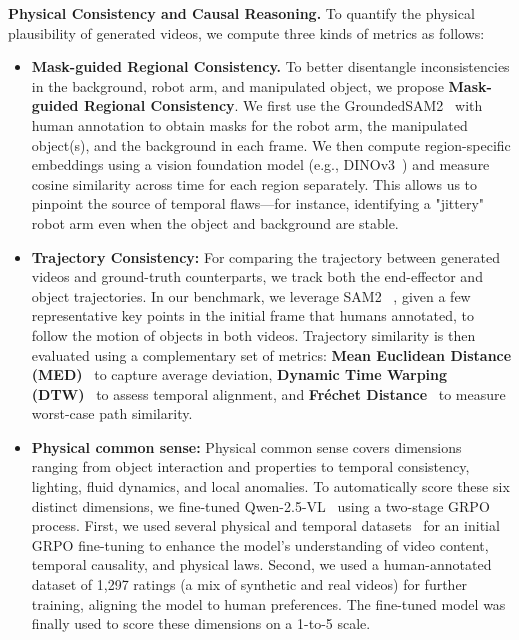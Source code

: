 \textbf{Physical Consistency and Causal Reasoning.}
To quantify the physical plausibility of generated videos, we compute three kinds of metrics as follows:
\begin{itemize}
    \item \textbf{Mask-guided Regional Consistency.}
    To better disentangle inconsistencies in the background, robot arm, and manipulated object, we propose \textbf{Mask-guided Regional Consistency}. We first use the GroundedSAM2~\cite{ren2024grounded} with human annotation to obtain masks for the robot arm, the manipulated object(s), and the background in each frame. We then compute region-specific embeddings using a vision foundation model (e.g., DINOv3~\cite{siméoni2025dinov3}) and measure cosine similarity across time for each region separately. This allows us to pinpoint the source of temporal flaws—for instance, identifying a "jittery" robot arm even when the object and background are stable.

    \item \textbf{Trajectory Consistency:} For comparing the trajectory between generated videos and ground-truth counterparts, we track both the end-effector and object trajectories. In our benchmark, we leverage SAM2  ~\cite{ravi2024sam}, given a few representative key points in the initial frame that humans annotated, to follow the motion of objects in both videos. 
    Trajectory similarity is then evaluated using a complementary set of metrics: \textbf{Mean Euclidean Distance (MED)}~\cite{Dokmanic_2015} to capture average deviation, \textbf{Dynamic Time Warping (DTW)}~\cite{Müller2007} to assess temporal alignment, and \textbf{Fréchet Distance}~\cite{Eiter1994ComputingDF} to measure worst-case path similarity.
    
    \item \textbf{Physical common sense:} Physical common sense covers dimensions ranging from object interaction and properties to temporal consistency, lighting, fluid dynamics, and local anomalies. To automatically score these six distinct dimensions, we fine-tuned Qwen-2.5-VL~\cite{bai2025qwen25vltechnicalreport} using a two-stage GRPO~\cite{shao2024deepseekmath} process. First, we used several physical and temporal datasets~\cite{krojer2025shortcutawarevideoqabenchmarkphysical, chow2025physbench, bansal2025videophy, cores2025losttimenewtemporal, liu2024tempcompassvideollmsreally, zhang2024unveiling} for an initial GRPO fine-tuning to enhance the model's understanding of video content, temporal causality, and physical laws. Second, we used a human-annotated dataset of 1,297 ratings (a mix of synthetic and real videos) for further training, aligning the model to human preferences. The fine-tuned model was finally used to score these dimensions on a 1-to-5 scale.


\end{itemize}
